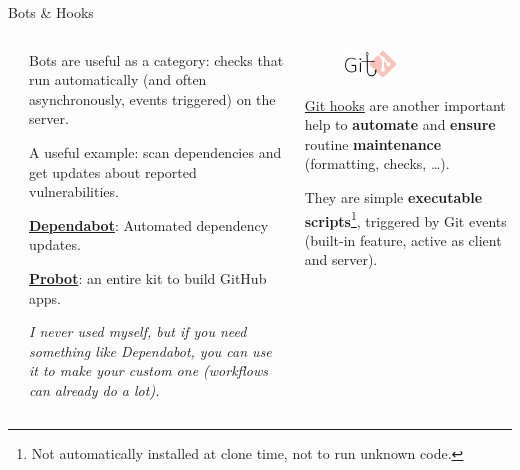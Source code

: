\documentclass[9pt]{beamer}
\begin{document}
\begin{frame}{Bots \& Hooks}
    \begin{columns}
        \begin{column}{0.05\textwidth}
        \end{column}
        \begin{column}{0.45\textwidth}
            Bots are useful as a category: checks that run automatically (and
            often asynchronously, events triggered) on the server.
            \vspace*{15pt}

            A useful example: scan dependencies and get updates about reported
            vulnerabilities.
            \vspace*{5pt}

            \href{https://github.com/dependabot}{\textbf{Dependabot}}:
            Automated
            dependency updates.

            \href{https://probot.github.io/}{\textbf{Probot}}: an entire kit to
            build GitHub apps.
            \vspace*{5pt}

            {\itshape\small
                I never used myself, but if you need something like Dependabot,
                you can use it to make your custom one (workflows can already
                do a lot).
            }
        \end{column}
        \begin{column}{0.45\textwidth}
            \begin{figure}
                \centering
                \includegraphics[width=0.4\textwidth]{hooks}
            \end{figure}
            \href{https://git-scm.com/book/en/v2/Customizing-Git-Git-Hooks}{Git
            hooks} are another important help to \textbf{automate} and
            \textbf{ensure} routine \textbf{maintenance} (formatting, checks,
            \dots).\newline

            They are simple \textbf{executable scripts}\footnote{
                Not automatically installed at clone time, not to run unknown
                code.
            }, triggered by Git events (built-in feature, active as client and
            server).
            \vspace*{10pt}


\end{column}
\end{columns}
\end{frame}
\end{document}

